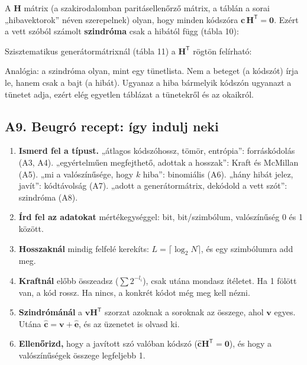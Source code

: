 A $\mathbf H$ mátrix (a szakirodalomban paritásellenőrző mátrix, a táblán a sorai „hibavektorok” néven szerepelnek) olyan, hogy minden kódszóra $\mathbf c\,\mathbf H^{\mathsf T}=\mathbf 0$. Ezért a vett szóból számolt \textbf{szindróma} csak a hibától függ (tábla 10):

\begin{center}\end{center}

Szisztematikus generátormátrixnál (tábla 11) a $\mathbf H^{\mathsf T}$ rögtön felírható:

\begin{center}\end{center}

Analógia: a szindróma olyan, mint egy tünetlista. Nem a beteget (a kódszót) írja le, hanem csak a bajt (a hibát). Ugyanaz a hiba bármelyik kódszón ugyanazt a tünetet adja, ezért elég egyetlen táblázat a tünetekről és az okaikról.

\subsection{\texorpdfstring{A9. Beugró recept: így indulj neki}{A9. Beugró recept: így indulj neki}}\label{a6-recept}
\begin{enumerate}
\item \textbf{Ismerd fel a típust.} „átlagos kódszóhossz, tömör, entrópia”: forráskódolás (A3, A4). „egyértelműen megfejthető, adottak a hosszak”: Kraft és McMillan (A5). „mi a valószínűsége, hogy $k$ hiba”: binomiális (A6). „hány hibát jelez, javít”: kódtávolság (A7). „adott a generátormátrix, dekódold a vett szót”: szindróma (A8).
\item \textbf{Írd fel az adatokat} mértékegységgel: bit, bit/szimbólum, valószínűség 0 és 1 között.
\item \textbf{Hosszaknál} mindig felfelé kerekíts: $L=\lceil\log_2 N\rceil$, és egy szimbólumra add meg.
\item \textbf{Kraftnál} előbb összeadsz ($\sum 2^{-l_i}$), csak utána mondasz ítéletet. Ha 1 fölött van, a kód rossz. Ha nincs, a konkrét kódot még meg kell nézni.
\item \textbf{Szindrómánál} a $\mathbf v\mathbf H^{\mathsf T}$ szorzat azoknak a soroknak az összege, ahol $\mathbf v$ egyes. Utána $\hat{\mathbf c}=\mathbf v+\hat{\mathbf e}$, és az üzenetet is olvasd ki.
\item \textbf{Ellenőrizd,} hogy a javított szó valóban kódszó ($\hat{\mathbf c}\mathbf H^{\mathsf T}=\mathbf 0$), és hogy a valószínűségek összege legfeljebb 1.
\end{enumerate}

